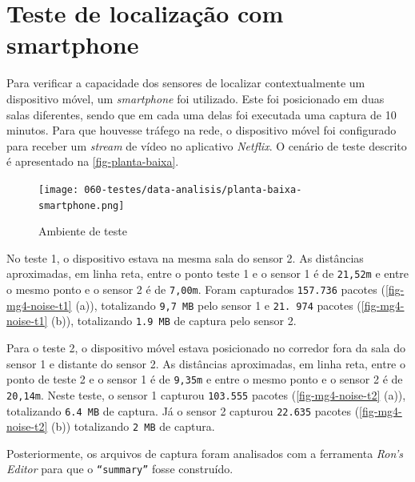 \section{Teste de localização com smartphone}
\label{sec:teste-smarphone}

Para verificar a capacidade dos sensores de localizar contextualmente um
dispositivo móvel, um \emph{smartphone} foi utilizado. Este foi posicionado em duas salas
diferentes, sendo que em cada uma delas foi executada uma captura de 10 minutos. Para
que houvesse tráfego na rede, o dispositivo móvel foi configurado para receber um
\emph{stream} de vídeo no aplicativo \emph{Netflix}. O cenário de teste descrito é apresentado na \autoref{fig-planta-baixa}.

\begin{figure}[htb]
	\caption{\label{fig-planta-baixa}Ambiente de teste}
	\begin{center}
		\texttt{[image: 060-testes/data-analisis/planta-baixa-smartphone.png]}
	\end{center}
\end{figure}


No teste 1, o dispositivo estava na mesma sala do sensor 2. As distâncias
aproximadas, em linha reta, entre o ponto teste 1 e o sensor 1 é de \texttt{21,52m} e
entre o mesmo ponto e o sensor 2 é de \texttt{7,00m}. Foram capturados
\texttt{157.736} pacotes (\autoref{fig-mg4-noise-t1} (a)), totalizando \texttt{9,7 MB} pelo sensor 1 e \texttt{21.
974} pacotes (\autoref{fig-mg4-noise-t1} (b)), totalizando \texttt{1.9 MB} de captura pelo sensor 2.

Para o teste 2, o dispositivo móvel estava posicionado no corredor fora da sala
do sensor 1 e distante do sensor 2. As distâncias aproximadas, em linha reta, entre o
ponto de teste 2 e o sensor 1 é de \texttt{9,35m} e entre o mesmo ponto e o sensor
2 é de \texttt{20,14m}. Neste teste, o sensor 1 capturou \texttt{103.555} pacotes (\autoref{fig-mg4-noise-t2} (a)),
totalizando \texttt{6.4 MB} de captura. Já o sensor 2 capturou \texttt{22.635}
pacotes (\autoref{fig-mg4-noise-t2} (b)) totalizando \texttt{2 MB} de captura.

Posteriormente, os arquivos de captura foram analisados com a ferramenta
\emph{Ron’s Editor} para que o \texttt{``summary''} fosse construído.

